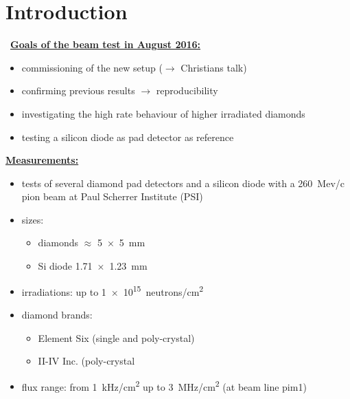 \documentclass[9pt]{beamer}
\begin{document}
\section{Introduction}
\begin{frame}\
	\underline{\textbf{Goals of the beam test in August 2016:}}
	\begin{itemize}
		\setlength{\itemsep}{\fill}
		\item commissioning of the new setup ($\rightarrow$ Christians talk)
		\item confirming previous results $\rightarrow$ reproducibility
		\item investigating the high rate behaviour of higher irradiated diamonds
		\item testing a silicon diode as pad detector as reference
	\end{itemize}
	\vspace*{.3cm}
	\underline{\textbf{Measurements:}}
	\begin{itemize}
		\setlength{\itemsep}{\fill}
		\item tests of several diamond pad detectors and a silicon diode with a \SI{260}{Mev/c} pion beam at Paul Scherrer Institute (PSI)
		\item sizes:
		\begin{itemize}
			 \item diamonds $\approx$ \SI{5x5}{mm}
			 \item Si diode \SI{1.71x1.23}{mm}
		\end{itemize}
		\item irradiations: up to \SI[exponent-product = \cdot]{1e15}{neutrons/cm^{2}}
		\item diamond brands:
		\begin{itemize}
			\item Element Six (single and poly-crystal)
			\item II-IV Inc. (poly-crystal
		\end{itemize}
		\item flux range: from \SI{1}{kHz/cm^{2}} up to \SI{3}{MHz/cm^{2}} (at beam line pim1)
	\end{itemize}
\end{frame}
\end{document}
